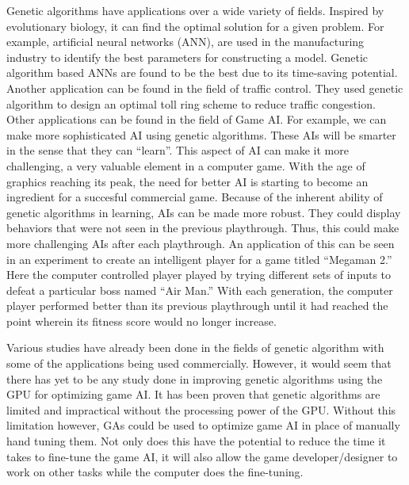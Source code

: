 Genetic algorithms have applications over a wide variety of fields.
Inspired by evolutionary biology, it can find the optimal solution
for a given problem. For example, artificial neural networks (ANN),
are used in the manufacturing industry to identify the best parameters
for constructing a model. Genetic algorithm based ANNs are found to be
the best due to its time-saving potential\cite{Venkatesan08}. Another
application can be found in the field of traffic control. They used
genetic algorithm to design an optimal toll ring scheme to reduce traffic
congestion\cite{Sumalee08}. Other applications can be found in the field
of Game AI. For example, we can make more sophisticated AI using genetic
algorithms. These AIs will be smarter in the sense that they can ``learn''.
This aspect of AI can make it more challenging, a very valuable element
in a computer game. With the age of graphics reaching its peak, the need
for better AI is starting to become an ingredient for a succesful
commercial game\cite{Yue06}. Because of the inherent ability of genetic
algorithms in learning, AIs can be made more robust. They could display
behaviors that were not seen in the previous playthrough. Thus, this
could make more challenging AIs after each playthrough. An application
of this can be seen in an experiment to create an intelligent player
for a game titled ``Megaman 2.'' Here the
computer controlled player played by trying different sets of inputs
to defeat a particular boss named ``Air Man.'' With each generation,
the computer player performed better than its previous playthrough
until it had reached the point wherein its fitness score would no longer
increase\cite{website:Kuliniewicz09}.




Various studies have already been done in the fields of genetic algorithm with
some of the applications being used commercially. However, it would seem that there
has yet to be any study done in improving genetic algorithms using the GPU for optimizing
game AI. It has been proven that genetic algorithms are limited and impractical without
the processing power of the GPU\cite{Banzhaf09}. Without this limitation however, GAs
could be used to optimize game AI in place of manually hand tuning them. Not only does
this have the potential to reduce the time it takes to fine-tune the game AI, it will
also allow the game developer/designer to work on other tasks while the computer
does the fine-tuning.